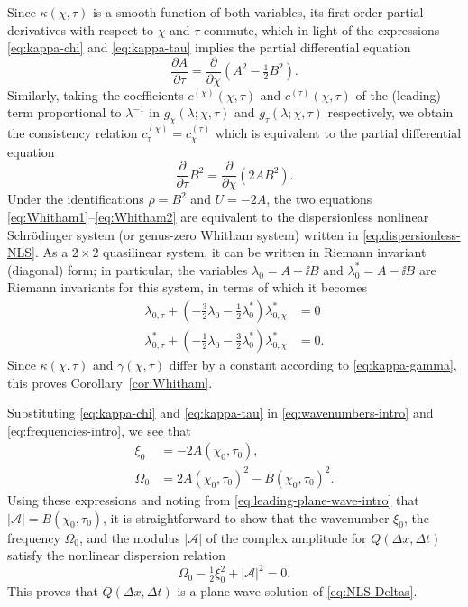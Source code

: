 \begin{remark}
Since $\kappa(\chi,\tau)$ is a smooth function of both variables, its first order partial derivatives with respect to $\chi$ and $\tau$ commute, which in light of the expressions \eqref{eq:kappa-chi} and \eqref{eq:kappa-tau} implies the partial differential equation
\begin{equation}
\frac{\partial A}{\partial\tau}=\frac{\partial}{\partial\chi}(A^2-\tfrac{1}{2}B^2).
\label{eq:Whitham1}
\end{equation}
Similarly, taking the coefficients $c^{(\chi)}(\chi,\tau)$ and $c^{(\tau)}(\chi,\tau)$ of the (leading) term proportional to $\lambda^{-1}$ in $g_\chi(\lambda;\chi,\tau)$ and $g_\tau(\lambda;\chi,\tau)$ respectively, we obtain the consistency relation $c^{(\chi)}_\tau=c^{(\tau)}_\chi$ which is equivalent to the partial differential equation
\begin{equation}
\frac{\partial}{\partial\tau}B^2=\frac{\partial}{\partial\chi}(2AB^2).
\label{eq:Whitham2}
\end{equation}
Under the identifications $\rho=B^2$ and $U=-2A$, the two equations \eqref{eq:Whitham1}--\eqref{eq:Whitham2} are equivalent to the dispersionless nonlinear Schr\"odinger system (or genus-zero Whitham system) written in \eqref{eq:dispersionless-NLS}.  As a $2\times 2$ quasilinear system, it can be written in Riemann invariant (diagonal) form; 
in particular, the variables $\lambda_0=A+\ii B$ and $\lambda_0^*=A-\ii B$ are Riemann invariants for this system, in terms of which it becomes
\begin{equation}
\begin{split}
\lambda_{0,\tau} + \left(-\tfrac{3}{2}\lambda_0-\tfrac{1}{2}\lambda_0^*\right)\lambda_{0,\chi}^*&=0\\
\lambda_{0,\tau}^* + \left(-\tfrac{1}{2}\lambda_0-\tfrac{3}{2}\lambda_0^*\right)\lambda_{0,\chi}^*&=0.
\end{split}
\end{equation}
Since $\kappa(\chi,\tau)$ and $\gamma(\chi,\tau)$ differ by a constant according to \eqref{eq:kappa-gamma}, this proves Corollary~\ref{cor:Whitham}.
\label{rem:Whitham}
\end{remark}
Substituting \eqref{eq:kappa-chi} and \eqref{eq:kappa-tau} in \eqref{eq:wavenumbers-intro} and \eqref{eq:frequencies-intro}, we see that
\begin{align}
\xi_0 &= -2 A(\chi_0,\tau_0)\label{eq:xi-0-explicit},\\
\Omega_0 &= 2 A(\chi_0,\tau_0)^2 - B(\chi_0,\tau_0)^2\label{eq:Omega-0-explicit}.
\end{align}
Using these expressions and noting from \eqref{eq:leading-plane-wave-intro} that $|\mathcal{A}| = B(\chi_0,\tau_0)$, it is straightforward to show that  the wavenumber $\xi_0$, the frequency $\Omega_0$, and the modulus $|\mathcal{A}|$ of the complex amplitude for $Q(\Delta x, \Delta t)$ satisfy the nonlinear dispersion relation
\begin{equation}
\Omega_0 - \tfrac{1}{2}\xi_0^2 +|\mathcal{A}|^2 = 0.
\label{eq:nls-dispersion}
\end{equation}
This proves that $Q(\Delta x, \Delta t)$ is a plane-wave solution of \eqref{eq:NLS-Deltas}.


